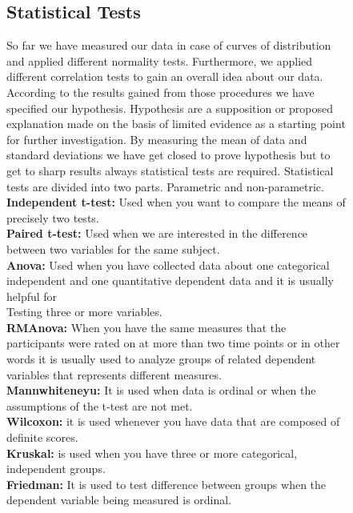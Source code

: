 \documentclass[letterpaper, 10 pt, conference]{ieeeconf}
\begin{document}
\begin{figure}[h!]
\subsection{Statistical Tests}
So far we have measured our data in case of curves of distribution and applied different normality tests. Furthermore, we applied different correlation tests to gain an overall idea about our data. According to the results gained from those procedures we have specified our hypothesis. Hypothesis are a supposition or proposed explanation made on the basis of limited evidence as a starting point for further investigation. By measuring the mean of data and standard deviations we have get closed to prove hypothesis but to get to sharp results always statistical tests are required. Statistical tests are divided into two parts. Parametric and non-parametric. 
\\\textbf{Independent t-test:} Used when you want to compare the means of precisely two tests.
\\\textbf{Paired t-test:} Used when we are interested in the difference between two variables for the same subject.
\\\textbf{Anova:} Used when you have collected data about one categorical independent and one quantitative dependent data and it is usually helpful for \\Testing three or more variables.
\\\textbf{RMAnova:} When you have the same measures that the participants were rated on at more than two time points or in other words it is usually used to analyze groups of related dependent variables that represents different measures.
\\\textbf{Mannwhiteneyu:} It is used when data is ordinal or when the assumptions of the t-test are not met.
\\\textbf{Wilcoxon:} it is used whenever you have data that are composed of  definite scores.
\\\textbf{Kruskal:} is used when you have three or more categorical, independent groups.
\\\textbf{Friedman:} It is used to test difference between groups when the dependent variable being measured is ordinal. \\\\

\end{figure}
\end{document}
